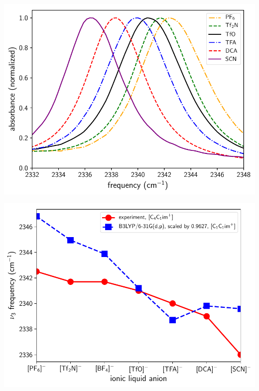 \documentclass{beamer}
\begin{document}
\begin{frame}
  \centering
  \includegraphics[scale=0.65]{./figures/experimental_spectra_shifting.pdf}
\end{frame}

\begin{frame}
  \centering
  \includegraphics[scale=0.65]{./figures/frequencies_calc_vs_expt1.pdf}
\end{frame}
\end{document}
